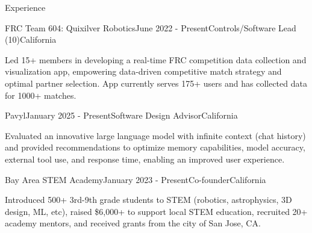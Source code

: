 \documentclass[
  10pt, %
]{resume}
\begin{document}
\begin{rSection}{Experience}
\begin{rSubsection}{FRC Team 604: Quixilver Robotics}{June 2022 - Present}{Controls/Software Lead (10)}{California}
    \item Led 15+ members in developing a real-time FRC competition data collection and visualization app, empowering data-driven competitive match strategy and optimal partner selection. App currently serves 175+ users and has collected data for 1000+ matches.
    
  \end{rSubsection}
        
  \begin{rSubsection}{Pavyl}{January 2025 - Present}{Software Design Advisor}{California}
    
    \item Evaluated an innovative large language model with infinite context (chat history) and provided recommendations to optimize memory capabilities, model accuracy, external tool use, and response time, enabling an improved user experience.
    
  \end{rSubsection}
        
  \begin{rSubsection}{Bay Area STEM Academy}{January 2023 - Present}{Co-founder}{California}
    
    \item Introduced 500+ 3rd-9th grade students to STEM (robotics, astrophysics, 3D design, ML, etc), raised \$6,000+ to support local STEM education, recruited 20+ academy mentors, and received grants from the city of San Jose, CA.
    
  \end{rSubsection}
        
	
\end{rSection}

\end{document}
